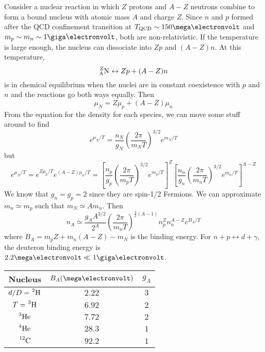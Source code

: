 \documentclass[a4paper,twoside,master.tex]{subfiles}
\begin{document}
Consider a nuclear reaction in which $ Z $ protons and $ A - Z $ neutrons combine to form a bound nucleus with atomic mass $ A $ and charge $ Z $. Since $ n $ and $ p $ formed after the QCD confinement transition at $ T_{\text{QCD}} \sim 150 \mega\electronvolt $ and $ m_p \sim m_n \sim 1 \giga\electronvolt $, both are non-relativistic. If the temperature is large enough, the nucleus can dissociate into $ Zp $ and $ (A - Z)n $. At this temperature,
\begin{equation}
    \nuclide[Z][A]{N} \leftrightarrow Z p + (A - Z)n
\end{equation}
is in chemical equilibrium when the nuclei are in constant coexistence with $ p $ and $ n $ and the reactions go both ways equally. Then
\begin{equation}
    \mu_N = Z \mu_p + (A - Z) \mu_n
\end{equation}
From the equation for the density for each species, we can move some stuff around to find
\begin{equation}
    e^{\mu_N /T} = \frac{n_N}{g_N} \left( \frac{2 \pi}{m_N T} \right)^{3/2} e^{m_N / T}
\end{equation}
but
\begin{equation}
    e^{\mu_N / T} = e^{Z \mu_p / T} e^{(A - Z) \mu_n / T} = \left[ \frac{n_p}{g_p} \left( \frac{2 \pi}{m_p T} \right)^{3/2} e^{m_p / T} \right]^Z \left[ \frac{n_n}{g_n} \left( \frac{2 \pi}{m_n T} \right)^{3/2} e^{m_n / T} \right]^{A-Z}
\end{equation}
We know that $ g_n = g_p = 2 $ since they are spin-1/2 Fermions. We can approximate $ m_n \simeq m_p $ such that $ m_N \simeq A m_n $. Then
\begin{equation}
    n_A \simeq \frac{g_A A^{3/2}}{2^A} \left( \frac{2 \pi}{m_n T} \right)^{\frac{3}{2}(A - 1)} n_p^Z n_n^{A-Z} e^{B_A / T}
\end{equation}
where $ B_A = m_p Z + m_n (A - Z) - m_N $ is the binding energy. For $ n + p \leftrightarrow d + \gamma $, the deuteron binding energy is $ 2.2 \mega\electronvolt \ll 1 \giga\electronvolt $.
\begin{center}
    \begin{tabular}{@{}ccc@{}}
        \toprule
        Nucleus & $ B_A (\mega\electronvolt) $ & $ g_A $ \\
        \midrule
        $ d/D = \nuclide[2]{H} $ & $ 2.22 $ & $ 3 $ \\
        $ T = \nuclide[3]{H} $ & $ 6.92 $ & $ 2 $ \\
        $ \nuclide[3]{He} $ & $ 7.72 $ & $ 2 $ \\
        $ \nuclide[4]{He} $ & $ 28.3 $ & $ 1 $ \\
        $ \nuclide[12]{C} $ & $ 92.2 $ & $ 1 $ \\
        \bottomrule
    \end{tabular}
\end{center} \\
\end{document}
